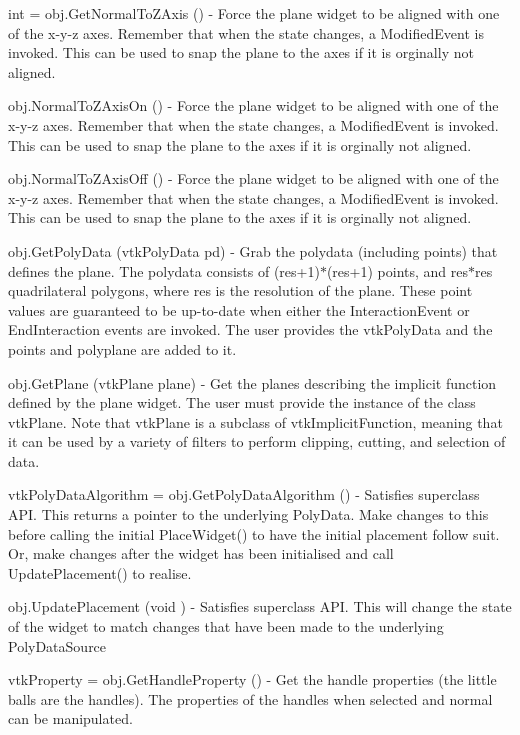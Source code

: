 \begin{DoxyItemize}
\item {\ttfamily int = obj.\-Get\-Normal\-To\-Z\-Axis ()} -\/ Force the plane widget to be aligned with one of the x-\/y-\/z axes. Remember that when the state changes, a Modified\-Event is invoked. This can be used to snap the plane to the axes if it is orginally not aligned.  
\item {\ttfamily obj.\-Normal\-To\-Z\-Axis\-On ()} -\/ Force the plane widget to be aligned with one of the x-\/y-\/z axes. Remember that when the state changes, a Modified\-Event is invoked. This can be used to snap the plane to the axes if it is orginally not aligned.  
\item {\ttfamily obj.\-Normal\-To\-Z\-Axis\-Off ()} -\/ Force the plane widget to be aligned with one of the x-\/y-\/z axes. Remember that when the state changes, a Modified\-Event is invoked. This can be used to snap the plane to the axes if it is orginally not aligned.  
\item {\ttfamily obj.\-Get\-Poly\-Data (vtk\-Poly\-Data pd)} -\/ Grab the polydata (including points) that defines the plane. The polydata consists of (res+1)$\ast$(res+1) points, and res$\ast$res quadrilateral polygons, where res is the resolution of the plane. These point values are guaranteed to be up-\/to-\/date when either the Interaction\-Event or End\-Interaction events are invoked. The user provides the vtk\-Poly\-Data and the points and polyplane are added to it.  
\item {\ttfamily obj.\-Get\-Plane (vtk\-Plane plane)} -\/ Get the planes describing the implicit function defined by the plane widget. The user must provide the instance of the class vtk\-Plane. Note that vtk\-Plane is a subclass of vtk\-Implicit\-Function, meaning that it can be used by a variety of filters to perform clipping, cutting, and selection of data.  
\item {\ttfamily vtk\-Poly\-Data\-Algorithm = obj.\-Get\-Poly\-Data\-Algorithm ()} -\/ Satisfies superclass A\-P\-I. This returns a pointer to the underlying Poly\-Data. Make changes to this before calling the initial Place\-Widget() to have the initial placement follow suit. Or, make changes after the widget has been initialised and call Update\-Placement() to realise.  
\item {\ttfamily obj.\-Update\-Placement (void )} -\/ Satisfies superclass A\-P\-I. This will change the state of the widget to match changes that have been made to the underlying Poly\-Data\-Source  
\item {\ttfamily vtk\-Property = obj.\-Get\-Handle\-Property ()} -\/ Get the handle properties (the little balls are the handles). The properties of the handles when selected and normal can be manipulated.  

\end{DoxyItemize}
